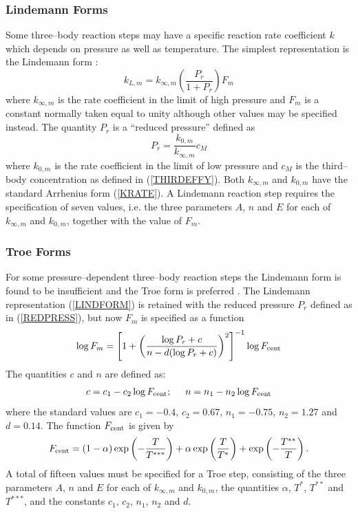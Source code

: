 \documentclass[dvips]{article}
\begin{document}
\subsubsection{Lindemann Forms}
\label{LINDSTEP}
Some three--body reaction steps may have a specific reaction rate coefficient
$k$ which depends on pressure as well as temperature.  The simplest
representation is the Lindemann form \cite{Lindemann}:
\begin{equation}
k_{L,m} = k_{\infty,m}\left(\frac{P_{r}}{1+P_{r}}\right)F_{m}
\label{LINDFORM}
\end{equation} 
where $k_{\infty,m}$ is the rate coefficient in the limit of high pressure
and $F_{m}$ is a constant normally taken equal to unity although other
values may be specified instead.  The quantity $P_{r}$ is a ``reduced pressure''
defined as
\begin{equation}
P_{r} = \frac{k_{0,m}}{k_{\infty,m}}c_{M}
\label{REDPRESS}
\end{equation} 
where $k_{0,m}$ is the rate coefficient in the limit of low pressure and
$c_{M}$ is the third--body concentration as defined in (\ref{THIRDEFFY}).
Both $k_{\infty,m}$ and $k_{0,m}$ have the standard Arrhenius form
(\ref{KRATE}).  A Lindemann reaction step requires the specification of seven
values, i.e. the three parameters $A$, $n$ and $E$ for each of $k_{\infty,m}$
and $k_{0,m}$, together with the value of $F_{m}$.

\subsubsection{Troe Forms}
\label{TROESTEP}
For some pressure--dependent three--body reaction steps the Lindemann form is
found to be insufficient and the Troe form is preferred \cite{Troe}. 
The Lindemann
representation (\ref{LINDFORM}) is retained with the reduced pressure
$P_{r}$ defined as in (\ref{REDPRESS}), but now $F_{m}$ is specified as a
function
\begin{equation}
\log F_{m} = \left[
1+\left(
\frac{\log P_{r} + c}{{n}-d(\log P_{r} + c)}
\right)^{2}
\right]^{-1}\log F_{\rm cent}
\label{TROEFORM}
\end{equation} 
The quantities $c$ and $n$ are defined as:
\begin{equation}
c = c_{1} - c_{2}\log F_{\rm cent};\hspace{5mm}
n = n_{1} - n_{2}\log F_{\rm cent}
\end{equation}
where the standard values are $c_{1} = -0.4$, $c_{2} = 0.67$, $n_{1} = -0.75$,
$n_{2} = 1.27$ and $d = 0.14$.  The function $F_{\rm cent}$ is given by
\begin{equation}
F_{\rm cent} = (1-\alpha)\exp\left(-\frac{T}{T^{***}}\right)
+ \alpha \exp\left(\frac{T}{T^{*}}\right)
+ \exp\left(-\frac{T^{**}}{T}\right).
\end{equation}
A total of fifteen values must be specified for a Troe step,
consisting of the three parameters $A$, $n$ and $E$ for each of $k_{\infty,m}$
and $k_{0,m}$, the quantities $\alpha$, $T^{*}$, $T^{**}$ and $T^{***}$,
and the constants $c_{1}$, $c_{2}$, $n_{1}$, $n_{2}$ and $d$.
\end{document}
